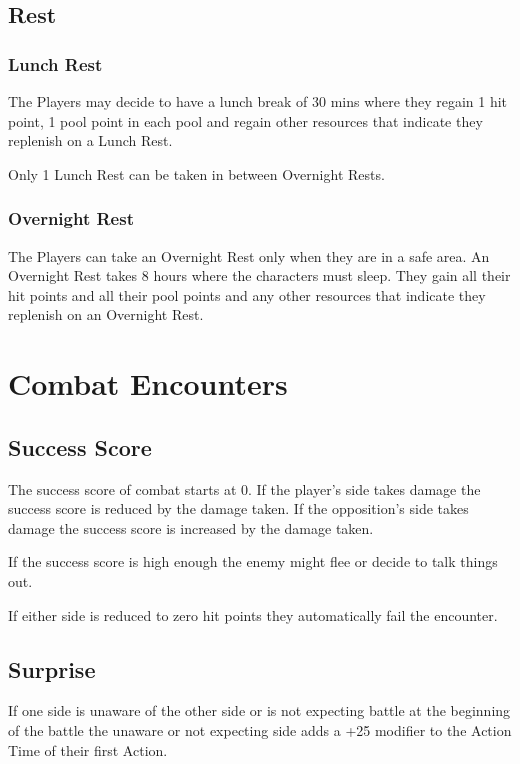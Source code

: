\documentclass[a4paper,12pt,oneside]{book}
\begin{document}
            \subsection{Rest}
                \subsubsection{Lunch Rest}
                    The Players may decide to have a lunch break of 30 mins where they regain 1 hit point, 1 pool point in each pool and regain other resources that indicate they replenish on a Lunch Rest.

                    Only 1 Lunch Rest can be taken in between Overnight Rests.
                \subsubsection{Overnight Rest}
                    The Players can take an Overnight Rest only when they are in a safe area. An Overnight Rest takes 8 hours where the characters must sleep. They gain all their hit points and all their pool points and any other resources that indicate they replenish on an Overnight Rest.
        
        \section{Combat Encounters}
            \subsection{Success Score}
                The success score of combat starts at 0. If the player's side takes damage the success score is reduced by the damage taken. If the opposition's side takes damage the success score is increased by the damage taken.

                If the success score is high enough the enemy might flee or decide to talk things out.

                If either side is reduced to zero hit points they automatically fail the encounter.

            \subsection{Surprise}
                If one side is unaware of the other side or is not expecting battle at the beginning of the battle the unaware or not expecting side adds a +25 modifier to the Action Time of their first Action.
\end{document}
